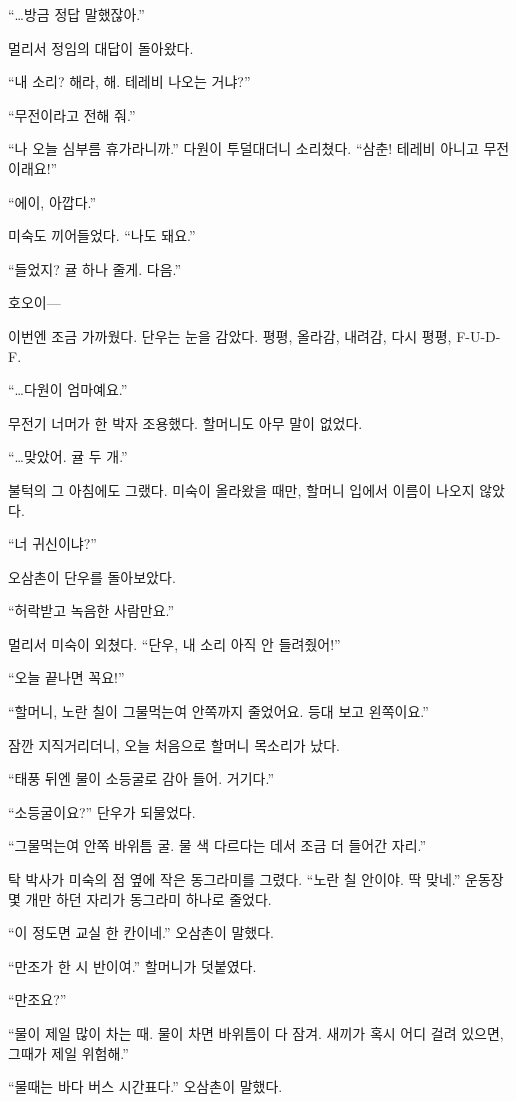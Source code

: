 \documentclass[
  korean,
  letterpaper,
  twoside,
  open=any,
  fontsize=12.5pt,
  headings=small]{scrbook}
\begin{document}
``\ldots 방금 정답 말했잖아.''

멀리서 정임의 대답이 돌아왔다.

``내 소리? 해라, 해. 테레비
나오는 거냐?''

``무전이라고 전해 줘.''

``나 오늘 심부름 휴가라니까.''
다원이 투덜대더니 소리쳤다.
``삼춘! 테레비 아니고
무전이래요!''

``에이, 아깝다.''

미숙도 끼어들었다. ``나도
돼요.''

``들었지? 귤 하나 줄게.
다음.''

호오이---

이번엔 조금 가까웠다. 단우는
눈을 감았다. 평평, 올라감,
내려감, 다시 평평,
\mbox{F-U-D-F.}

``\ldots 다원이 엄마예요.''

무전기 너머가 한 박자
조용했다. 할머니도 아무 말이
없었다.

``\ldots 맞았어. 귤 두 개.''

불턱의 그 아침에도 그랬다.
미숙이 올라왔을 때만, 할머니
입에서 이름이 나오지 않았다.

``너 귀신이냐?''

오삼촌이 단우를 돌아보았다.

``허락받고 녹음한 사람만요.''

멀리서 미숙이 외쳤다. ``단우,
내 소리 아직 안 들려줬어!''

``오늘 끝나면 꼭요!''

``할머니, 노란 칠이 그물먹는여
안쪽까지 줄었어요. 등대 보고
왼쪽이요.''

잠깐 지직거리더니, 오늘
처음으로 할머니 목소리가 났다.

``태풍 뒤엔 물이 소등굴로 감아
들어. 거기다.''

``소등굴이요?'' 단우가
되물었다.

``그물먹는여 안쪽 바위틈 굴.
물 색 다르다는 데서 조금 더
들어간 자리.''

탁 박사가 미숙의 점 옆에 작은
동그라미를 그렸다. ``노란 칠
안이야. 딱 맞네.'' 운동장 몇
개만 하던 자리가 동그라미
하나로 줄었다.

``이 정도면 교실 한 칸이네.''
오삼촌이 말했다.

``만조가 한 시 반이여.''
할머니가 덧붙였다.

``만조요?''

``물이 제일 많이 차는 때. 물이
차면 바위틈이 다 잠겨. 새끼가
혹시 어디 걸려 있으면, 그때가
제일 위험해.''

``물때는 바다 버스 시간표다.''
오삼촌이 말했다.
\end{document}
